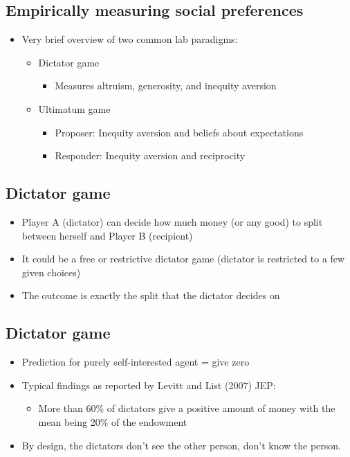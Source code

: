\subsection{Empirically measuring social preferences}
\begin{itemize}
    \item Very brief overview of two common lab paradigms:
    \begin{itemize}
        \item Dictator game
        \begin{itemize}
            \item Measures altruism, generosity, and inequity aversion
        \end{itemize}
        \item Ultimatum game
        \begin{itemize}
            \item Proposer: Inequity aversion and beliefs about expectations
            \item Responder: Inequity aversion and reciprocity
        \end{itemize}
    \end{itemize}
\end{itemize}

\subsection{Dictator game}
\begin{itemize}
    \item Player A (dictator) can decide how much money (or any good) to split between herself and Player B (recipient)
    \item It could be a free or restrictive dictator game (dictator is restricted to a few given choices)
    \item The outcome is exactly the split that the dictator decides on
\end{itemize}
\subsection{Dictator game}
\begin{itemize}
    \item Prediction for purely self-interested agent = give zero
    \item Typical findings as reported by Levitt and List (2007) JEP:
    \begin{itemize}
        \item More than 60$\%$ of dictators give a positive amount of money with the mean being 20$\%$ of the endowment
    \end{itemize}
    \item By design, the dictators don't see the other person, don't know the person.
\end{itemize}
